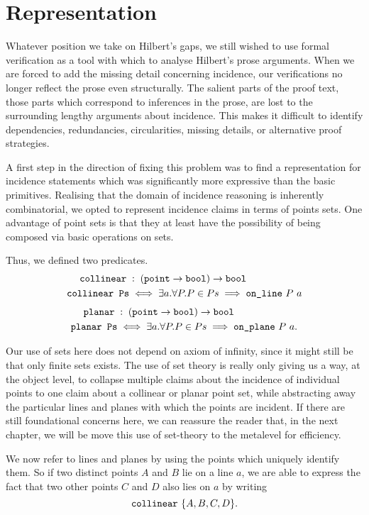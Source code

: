 \section{Representation}
Whatever position we take on Hilbert's gaps, we still wished to use formal verification as a tool with which to analyse Hilbert's prose arguments. When we are forced to add the missing detail concerning incidence, our verifications no longer reflect the prose even structurally. The salient parts of the proof text, those parts which correspond to inferences in the prose, are lost to the surrounding lengthy arguments about incidence. This makes it difficult to identify dependencies, redundancies, circularities, missing details, or alternative proof strategies.

A first step in the direction of fixing this problem was to find a representation for incidence statements which was significantly more expressive than the basic primitives. Realising that the domain of incidence reasoning is inherently combinatorial, we opted to represent incidence claims in terms of points sets. One advantage of point sets is that they at least have the possibility of being composed via basic operations on sets.

Thus, we defined two predicates.
\begin{align*}
\texttt{collinear}\;&:\;(\texttt{point}\rightarrow\texttt{bool})\rightarrow\texttt{bool}
\\\texttt{collinear\ Ps} &\iff \exists a. \forall P. P \in Ps \implies \texttt{on\_line}\ P\ a
\end{align*}
\begin{align*}
\texttt{planar}\;&:\;(\texttt{point}\rightarrow\texttt{bool})\rightarrow\texttt{bool}
\\\texttt{planar\ Ps} &\iff \exists a. \forall P. P \in Ps \implies \texttt{on\_plane}\ P\ a.
\end{align*}

Our use of sets here does not depend on axiom of infinity, since it might still be that only finite sets exists. The use of set theory is really only giving us a way, at the object level, to collapse multiple claims about the incidence of individual points to one claim about a collinear or planar point set, while abstracting away the particular lines and planes with which the points are incident. If there are still foundational concerns here, we can reassure the reader that, in the next chapter, we will be move this use of set-theory to the metalevel for efficiency.

We now refer to lines and planes by using the points which uniquely identify them. So if two distinct points $A$ and $B$ lie on a line $a$, we are able to express the fact that two other points $C$ and $D$ also lies on $a$ by writing 
\begin{displaymath}
\texttt{collinear}\ \{A, B, C, D\}.
\end{displaymath}

